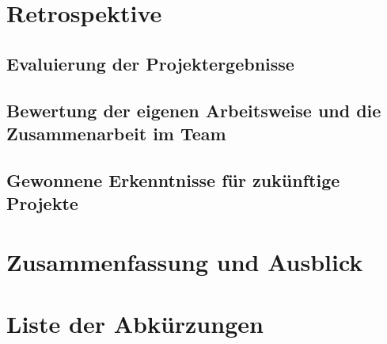 \documentclass[a4paper,11pt,DIV=12,overfullrule=on]{scrreprt}%
\begin{document}
\chapter{Retrospektive}
\section{Evaluierung der Projektergebnisse}
\section{Bewertung der eigenen Arbeitsweise und die Zusammenarbeit im Team}
\section{Gewonnene Erkenntnisse für zukünftige Projekte}

\chapter{Zusammenfassung und Ausblick}

\chapter*{Liste der Abkürzungen}
\begin{acronym}
\end{acronym}

\listoffigures
\end{document}

